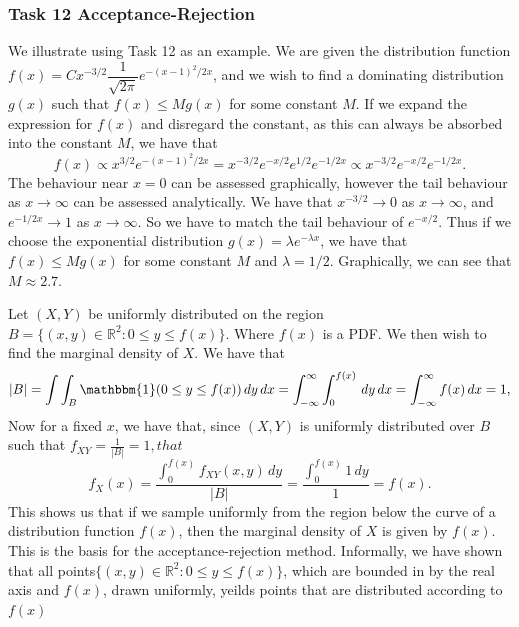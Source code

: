 \documentclass{article}
\theoremstyle{definition}
\theoremstyle{remark}
\begin{document}
\subsubsection{Task 12 Acceptance-Rejection}
We illustrate using Task 12 as an example. 
We are given the distribution function $f(x) = C  x^{-3/2} \dfrac{1}{\sqrt{2\pi}} e^{-(x-1)^2/2x}$, and we wish to find a dominating distribution $g(x)$ such that $f(x) \leq M g(x)$ for some constant $M$. If we expand the expression for $f(x)$ and disregard the constant, as this can always be absorbed into the constant $M$, we have that
\begin{equation}
    f(x) \propto x^{3/2} e^{-(x-1)^2/2x} = x^{-3/2} e^{-x/2} e^{1/2} e^{-1/2x} \propto x^{-3/2} e^{-x/2} e^{-1/2x}.
\end{equation}
The behaviour near $x= 0$ can be assessed graphically, however the tail behaviour as $x \to \infty$ can be assessed analytically. We have that $x^{-3/2} \to 0$ as $x \to \infty$, and $e^{-1/2x} \to 1$ as $x \to \infty$. So we have to match the tail behaviour of $e^{-x/2}
$. Thus if we choose the exponential distribution $g(x) = \lambda e^{-\lambda x}$, we have that $f(x) \leq M g(x)$ for some constant $M$ and $\lambda = 1/2$. Graphically, we can see that $M \approx 2.7$.\vspace{1em}


Let $(X,Y)$ be uniformly distributed on the region $B = \{(x,y) \in \mathbb{R}^2 : 0 \leq y \leq f(x)\}$. Where $f(x)$ is a PDF. We then wish to find the marginal density of $X$. We have that
\begin{equation}
    |B| = \int \int_B \mathbbm{1}(0 \leq y \leq f(x)) \, dy \, dx = \int_{-\infty}^{\infty} \int_0^{f(x)} \, dy \, dx = \int_{-\infty}^{\infty} f(x) \, dx = 1,
\end{equation}
Now for a fixed $x$, we have that, since $(X,Y)$ is uniformly distributed over $B$ such that $f_{XY}= \frac{1}{|B|} = 1, that$
\begin{equation}
    f_{X}(x) = \dfrac{\int_0^{f(x)} f_{XY}(x,y)\, dy}{|B|} = \dfrac{\int_0^{f(x)} 1\, dy}{1} = f(x).
\end{equation}
This shows us that if we sample uniformly from the region below the curve of a distribution function $f(x)$, then the marginal density of $X$ is given by $f(x)$. This is the basis for the acceptance-rejection method. Informally, we have shown that all points$\{(x,y) \in \mathbb{R}^2 : 0 \leq y \leq f(x)\}$, which are bounded in by the real axis and $f(x)$, drawn uniformly, yeilds points that are distributed according to $f(x)$
\end{document}
